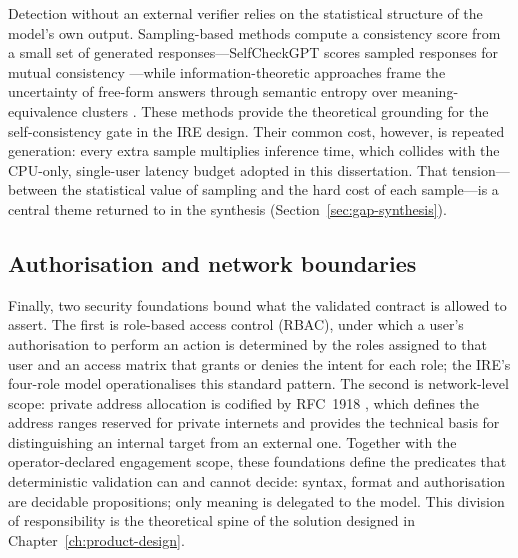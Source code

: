 Detection without an external verifier relies on the statistical structure of
the model's own output. Sampling-based methods compute a consistency score from
a small set of generated responses---SelfCheckGPT scores sampled responses for
mutual consistency \parencite{manakul2023selfcheckgpt}---while information-theoretic
approaches frame the uncertainty of free-form answers through semantic
entropy over meaning-equivalence clusters \parencite{kuhn2023semantic,
farquhar2024semantic}. These methods provide the theoretical grounding for the
self-consistency gate in the IRE design. Their common cost, however, is
repeated generation: every extra sample multiplies inference time, which
collides with the CPU-only, single-user latency budget adopted in this
dissertation. That tension---between the statistical value of sampling and the
hard cost of each sample---is a central theme returned to in the synthesis
(Section~\ref{sec:gap-synthesis}).

\subsection*{Authorisation and network boundaries}

Finally, two security foundations bound what the validated contract is allowed
to assert. The first is role-based access control (RBAC), under which a user's
authorisation to perform an action is determined by the roles assigned to that
user and an access matrix that grants or denies the intent for each role; the
IRE's four-role model operationalises this standard pattern. The second is
network-level scope: private address allocation is codified by RFC~1918
\parencite{rfc1918}, which defines the address ranges reserved for private
internets and provides the technical basis for distinguishing an internal
target from an external one. Together with the operator-declared engagement
scope, these foundations define the predicates that deterministic validation
can and cannot decide: syntax, format and authorisation are decidable
propositions; only meaning is delegated to the model. This division of
responsibility is the theoretical spine of the solution designed in
Chapter~\ref{ch:product-design}.


